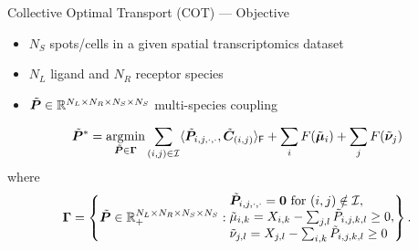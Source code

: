 \documentclass[10pt]{beamer}
\begin{document}
\begin{frame}{Collective Optimal Transport (COT)
--- Objective}
    \begin{itemize}
        \item $N_S$ spots/cells in a given spatial transcriptomics dataset
        \item $N_L$ ligand and $N_R$ receptor species
        \item $\Tilde{\bm{P}}\in \mathbb{R}^{N_L\times N_R\times N_S\times N_S}$ multi-species coupling
    \end{itemize}
    \begin{gather}
        \Tilde{\bm{P}}^* = \operatorname*{\arg\!min}_{\Tilde{\bm{P}}\in\bm{\Gamma}} \sum_{(i,j)\in\mathcal{I}}
        \langle\Tilde{\bm{P}}_{i,j,\cdot,\cdot},\Tilde{\bm{C}}_{(i,j)}\rangle_\mathsf{F} +\sum_{i}F(\Tilde{\bm{\mu}}_i) + \sum_{j}F(\Tilde{\bm{\nu}}_j)\label{eq:obj4d}
    \end{gather}
    where
    \begin{gather}
        \bm{\Gamma} = \left\{
        \Tilde{\bm{P}}\in\mathbb{R}_+^{N_L\times N_R\times N_S\times N_S}: 
        \begin{matrix*}[l]
        \Tilde{\bm{P}}_{i,j,\cdot,\cdot}=\bm{0}~\text{for}~(i,j)\notin\mathcal{I},\\
        \Tilde{\mu}_{i,k} = X_{i,k} - \sum_{j,l} \Tilde{P}_{i,j,k,l} \geq 0,\\
        \Tilde{\nu}_{j,l} = X_{j,l} - \sum_{i,k} \Tilde{P}_{i,j,k,l} \geq 0
        \end{matrix*}
        \right\}.\label{eq:cons4d}
    \end{gather}
\end{frame}

\end{document}

